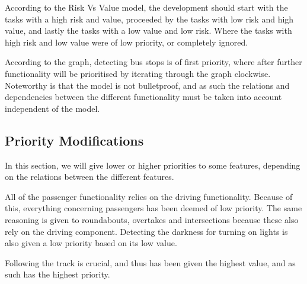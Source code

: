 According to the Risk Vs Value model, the development should start with the tasks with a high risk and value, proceeded by the tasks with low risk and high value, and lastly the tasks with a low value and low risk. Where the tasks with high risk and low value were of low priority, or completely ignored. 

According to the graph, detecting bus stops is of first priority, where after further functionality will be prioritised by iterating through the graph clockwise. Noteworthy is that the model is not bulletproof, and as such the relations and dependencies between the different functionality must be taken into account independent of the model.

\subsection{Priority Modifications} %

In this section, we will give lower or higher priorities to some features, depending on the relations between the different features.

All of the passenger functionality relies on the driving functionality. Because of this, everything concerning passengers has been deemed of low priority. The same reasoning is given to roundabouts, overtakes and intersections because these also rely on the driving component. Detecting the darkness for turning on lights is also given a low priority based on its low value.

Following the track is crucial, and thus has been given the highest value, and as such has the highest priority.
